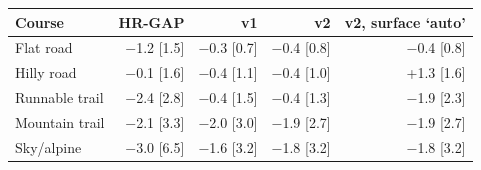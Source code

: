 \begin{tabular}{@{}lrrrr@{}}
\toprule
Course & HR-GAP & \ascent{} v1 & \ascent{} v2 & \ascent{} v2, surface `auto' \\
\midrule
Flat road & $-$1.2 [1.5] & $-$0.3 [0.7] & $-$0.4 [0.8] & $-$0.4 [0.8] \\
Hilly road & $-$0.1 [1.6] & $-$0.4 [1.1] & $-$0.4 [1.0] & +1.3 [1.6] \\
Runnable trail & $-$2.4 [2.8] & $-$0.4 [1.5] & $-$0.4 [1.3] & $-$1.9 [2.3] \\
Mountain trail & $-$2.1 [3.3] & $-$2.0 [3.0] & $-$1.9 [2.7] & $-$1.9 [2.7] \\
Sky/alpine & $-$3.0 [6.5] & $-$1.6 [3.2] & $-$1.8 [3.2] & $-$1.8 [3.2] \\
\bottomrule
\end{tabular}